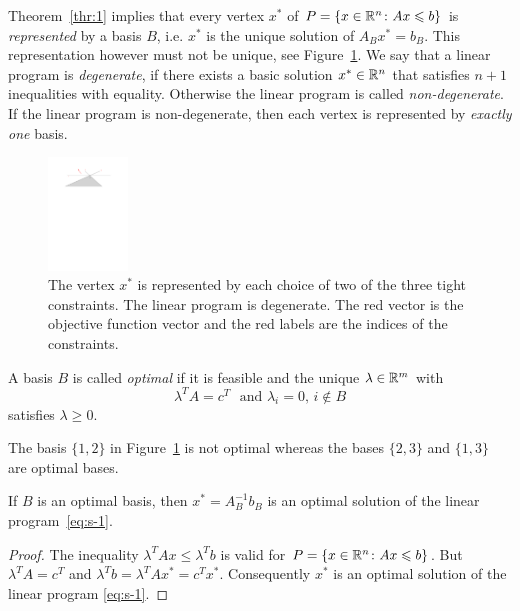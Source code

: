     Theorem~\ref{thr:1} implies that every vertex $x^*$ of $P = \{x
    \in \mathbb{R}^n \colon Ax \leqslant b\}$ is \emph{represented} by a basis $B$,
    i.e. $x^*$ is the unique solution of $A_Bx^* = b_B$. This
    representation however must not be unique, see
    Figure~\ref{fig:7}. We say that a linear program is \emph{degenerate}, if
    there exists a basic solution $x^* \in \mathbb{R}^n$ that satisfies $n+1$
    inequalities with equality. Otherwise the linear program is called
    \emph{non-degenerate}. If the linear program is non-degenerate,
    then each vertex is represented by \emph{exactly one} basis.

    \begin{figure}
      \centering
      \includegraphics[height=3cm]{figures/Degenerate.pdf}
      \caption{The vertex $x^*$ is represented by each choice of two of the three tight constraints. The linear program is degenerate. The red vector is the objective function vector and the red labels are the indices of the constraints.}
      \label{fig:7}
    \end{figure}



    \begin{definition}
      \label{def:s-2}
       A basis $B$ is called \emph{optimal} if it is feasible and the
       unique $\lambda \in \mathbb{R}^m$ 
       with 
       \begin{equation}
         \label{eq:s-5}
         \lambda^T A =  c^T \, \, \text{ and } \lambda_i = 0, \, i \notin B 
       \end{equation}
       satisfies $\lambda\geq0$. 
     \end{definition}


The basis $\{1,2\}$ in Figure~\ref{fig:7} is not optimal whereas the bases $\{2,3\}$ and $\{1,3\}$ are optimal bases. 


\begin{theorem}
  \label{thr:s-4}
  If $B$ is an optimal basis, then $x^* = A_B^{-1} b_B$ is an optimal solution of the linear program~\eqref{eq:s-1}. 
\end{theorem}

\begin{proof}
  The inequality $\lambda^T A x \leq \lambda^T b$ is valid for $P = \{x \in \mathbb{R}^n \colon Ax \leqslant b\}$. But $\lambda^T A =c^T$ and $\lambda^T b = \lambda^T Ax^* = c^Tx^*$. Consequently $x^*$ is an optimal solution of the linear program \eqref{eq:s-1}. 
\end{proof}


